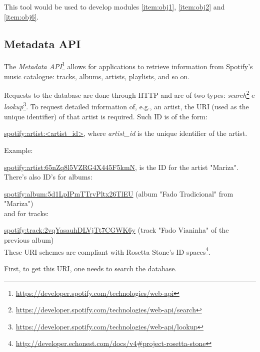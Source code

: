       This tool would be used to develop modules \ref{item:obj1}, \ref{item:obj2} and \ref{item:obj6}.
      



    \subsection{Metadata API} %
    \label{sub:metadata_api}

      The \emph{Metadata API}\footnote{\url{https://developer.spotify.com/technologies/web-api}} allows for applications to retrieve information from Spotify's music catalogue: tracks, albums, artists, playlists, and so on.

      Requests to the database are done through HTTP and are of two types: \emph{search}\footnote{\url{https://developer.spotify.com/technologies/web-api/search}} e \emph{lookup}\footnote{\url{https://developer.spotify.com/technologies/web-api/lookup}}.
      To request detailed information of, e.g., an artist, the URI (used as the unique identifier) of that artist is required. Such ID is of the form:

      \url{spotify:artist:<artist_id>}, where \emph{artist\_id} is the unique identifier of the artist.

      Example:

      \url{spotify:artist:65nZq8l5VZRG4X445F5kmN}, is the ID for the artist "Mariza". \\

      There's also ID's for albums:

      \url{spotify:album:5d1LpIPmTTrvPltx26TlEU} (album "Fado Tradicional" from "Mariza") \\

       and for tracks:

       \url{spotify:track:2vqYasauhDLVjTt7CGWK6y} (track "Fado Vianinha" of the previous album) \\

      These URI schemes are compliant with Rosetta Stone's ID spaces\footnote{\url{http://developer.echonest.com/docs/v4\#project-rosetta-stone}}.

      First, to get this URI, one needs to search the database.


